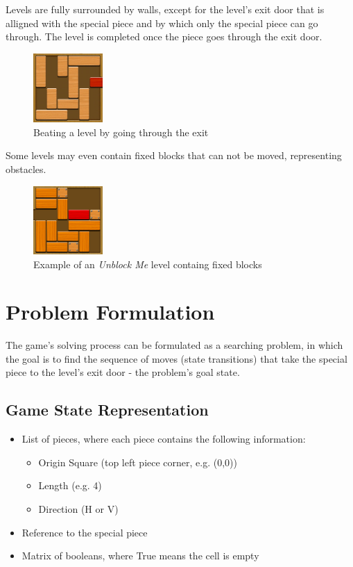 \documentclass[conference]{IEEEtran}
\begin{document}
Levels are fully surrounded by walls, except for the level's exit door that is alligned with the special piece and by which only the special piece can go through. The level is completed once the piece goes through the exit door.
 
\begin{figure}[H]
    \centerline{\includegraphics[width=100px]{img3.png}}
    \caption{Beating a level by going through the exit}
    \label{fig}
\end{figure}

Some levels may even contain fixed blocks that can not be moved, representing obstacles.
 
\begin{figure}[H]
    \centerline{\includegraphics[width=100px]{img4.png}}
    \caption{Example of an \textit{Unblock Me} level containg fixed blocks}
    \label{fig}
\end{figure}

\section{Problem Formulation}
The game's solving process can be formulated as a searching problem, in which the goal is to find the sequence of moves (state transitions) that take the special piece to the level's exit door - the problem's goal state. 

\subsection{Game State Representation} \label{subsec:gr}

\begin{itemize}
        \item List of pieces, where each piece contains the following information:
    \begin{itemize}
        \item Origin Square (top left piece corner, e.g. (0,0))
        \item Length (e.g. 4)
        \item Direction (H or V)
    \end{itemize}
    \item Reference to the special piece
    \item Matrix of booleans, where True means the cell is empty
\end{itemize}
\end{document}
